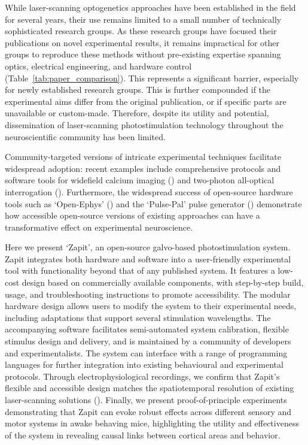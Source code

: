 While laser-scanning optogenetics approaches have been established in the field for several years, their use remains limited to a small number of technically sophisticated research groups.
As these research groups have focused their publications on novel experimental results, it remains impractical for other groups to reproduce these methods without pre-existing expertise spanning optics, electrical engineering, and hardware control (Table~\ref{tab:paper_comparison}).
This represents a significant barrier, especially for newly established research groups.
This is further compounded if the experimental aims differ from the original publication, or if specific parts are unavailable or custom-made.
Therefore, despite its utility and potential, dissemination of laser-scanning photostimulation technology throughout the neuroscientific community has been limited.

Community-targeted versions of  intricate experimental techniques facilitate widespread adoption: recent examples include comprehensive protocols and software tools for widefield calcium imaging (\cite{Couto2021ChronicBehavior}) and two-photon all-optical interrogation (\cite{Russell2022All-opticalMice}).
Furthermore, the widespread success of open-source hardware tools such as  `Open-Ephys' (\cite{Siegle2017OpenElectrophysiology}) and the `Pulse-Pal' pulse generator (\cite{Sanders2014ABehavior}) demonstrate how accessible open-source versions of existing approaches can have a transformative effect on experimental neuroscience.

Here we present `Zapit', an open-source galvo-based photostimulation system.
Zapit integrates both hardware and software into a user-friendly experimental tool with functionality beyond that of any published system.
It features a low-cost design based on commercially available components, with step-by-step build, usage, and troubleshooting instructions to promote accessibility.
The modular hardware design allows users to modify the system to their experimental needs, including adaptations that support several stimulation wavelengths.
The accompanying software facilitates semi-automated system calibration, flexible stimulus design and delivery,  and is maintained by a community of developers and experimentalists.
The system can interface with a range of programming languages for further integration into existing behavioural and experimental protocols.
Through electrophysiological recordings, we confirm that Zapit's flexible and accessible design matches the spatiotemporal resolution of existing laser-scanning solutions (\cite{Pinto2022MultipleCortex,Guo2014FlowMice,Li2019SpatiotemporalCircuits}).
Finally, we present proof-of-principle experiments demonstrating that Zapit can evoke robust effects across different sensory and motor systems in awake behaving mice, highlighting the utility and effectiveness of the system in revealing causal links between cortical areas and behavior.
